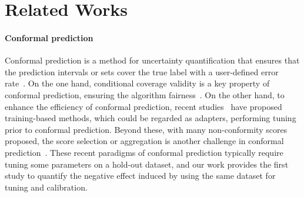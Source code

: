 \section{Related Works}
\label{sec:related_work}

\paragraph{Conformal prediction}
Conformal prediction is a method for uncertainty quantification that ensures that the prediction intervals or sets cover the true label with a user-defined error rate~\citep{papadopoulos2008inductive, vovk2005algorithmic, vovk2012conditional}. 
On the one hand, conditional coverage validity is a key property of conformal prediction, ensuring the algorithm fairness~\citep{angelopoulos2021uncertainty, gibbs2024conformal, romano2020classification,huang2024conformal}.
On the other hand, to enhance the efficiency of conformal prediction, recent studies~\citep{liu2025cadapter, stutz2022learning, kiyani2024length, kiyani2024conformal} have proposed training-based methods, which could be regarded as adapters, performing tuning prior to conformal prediction.
Beyond these, with many non-conformity scores proposed, the score selection or aggregation is another challenge in conformal prediction~\citep{yang2024selection, luo2024weighted, fan2024utopia, gasparin2024conformal, ge2024optimal, qin2024sat}.
These recent paradigms of conformal prediction typically require tuning some parameters on a hold-out dataset, and our work provides the first study to quantify the negative effect induced by using the same dataset for tuning and calibration.


